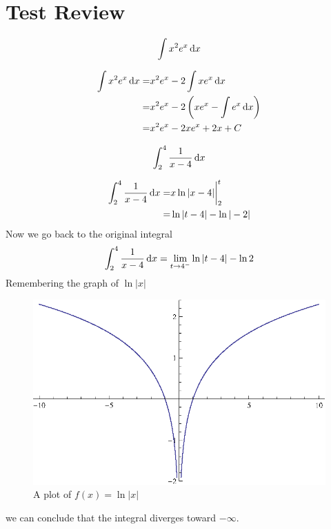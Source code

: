 \section{Test Review}
\begin{ex}
  \[ \int x^2 e^x \,\mathrm{d} x \]
  \begin{sol}
    \begin{align*}
      \int x^2 e^x\,\mathrm{d} x
      =& x^2 e^x-2\int x e^x \,\mathrm{d} x \\
      =& x^2 e^x -2 \left( x e^x - \int e^x \,\mathrm{d} x \right) \\
      =& x^2 e^x -2 x e^x +2x +C
    \end{align*}
  \end{sol}
\end{ex}
\begin{ex}
  \[ \int^4_2 \frac{1}{x-4}\,\mathrm{d} x \]
  \begin{sol}
    \begin{align*}
      \int^4_2 \frac{1}{x-4}\,\mathrm{d} x
      =& x\ln{|x-4|}\bigg|^t_2 \\
      =& \ln{|t-4|}-\ln{|-2|}
    \end{align*}
    Now we go back to the original integral
    \[
      \int^4_2 \frac{1}{x-4}\,\mathrm{d} x
      = \lim_{t \to 4^-}\ln{|t-4|}-\ln 2
      \]
      Remembering the graph of \(\ln{|x|}\)
      \begin{figure}[H]
        \begin{center}
          \includegraphics[scale=1]{graphs/logabsx}
        \end{center}
        \caption{A plot of \(f(x)=\ln{|x|}\)}
      \end{figure}
      we can conclude that the integral diverges toward $-\infty$.
  \end{sol}
\end{ex}
